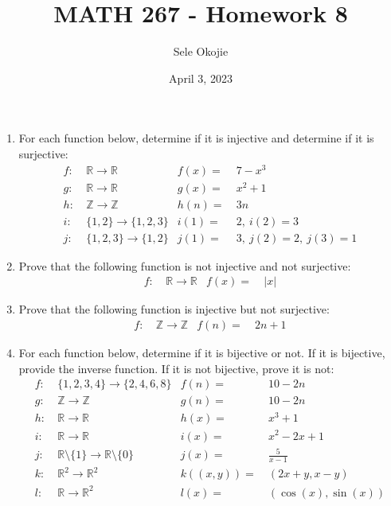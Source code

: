 \documentclass{article}
\title{MATH 267 - Homework 8}
\author{Sele Okojie}
\date{April 3, 2023}
\begin{document}
    \maketitle

    \begin{enumerate}

	\item For each function below, determine if it is injective and determine if it is surjective:
		  \begin{align*}
			f : & \ \mathbb{R} \rightarrow \mathbb{R} & f(x) = & \ 7 - x^3 \\
			g : & \ \mathbb{R} \rightarrow \mathbb{R} & g(x) = & \ x^2 + 1 \\
			h : & \ \mathbb{Z} \rightarrow \mathbb{Z} & h(n) = & \ 3n \\
			i : & \ \{ 1, 2 \} \rightarrow \{ 1, 2, 3 \} & i(1) = & \ 2, \ i(2) = 3 \\
			j : & \ \{ 1, 2, 3 \} \rightarrow \{ 1, 2 \} & j(1) = & \ 3, \ j(2) = 2, \ j(3) = 1
		  \end{align*}

	\item Prove that the following function is not injective and not surjective:
		  \begin{align*}
			f : & \ \mathbb{R} \rightarrow \mathbb{R} & f(x) = & \ |x|
		  \end{align*}

	\item Prove that the following function is injective but not surjective:
		  \begin{align*}
			f : & \ \mathbb{Z} \rightarrow \mathbb{Z} & f(n) = & \ 2n+1
		  \end{align*}

	\item For each function below, determine if it is bijective or not.  If it is bijective, provide the inverse function.  If it is not bijective, prove it is not:
		  \begin{align*}
			f : & \ \{ 1, 2, 3, 4 \} \rightarrow \{ 2, 4, 6, 8 \} & f(n) = & \ 10 - 2n \\
			g : & \ \mathbb{Z} \rightarrow \mathbb{Z} & g(n) = & \ 10 - 2n \\
			h : & \ \mathbb{R} \rightarrow \mathbb{R} & h(x) = & \ x^3 + 1 \\
			i : & \ \mathbb{R} \rightarrow \mathbb{R} & i(x) = & \ x^2 - 2x + 1 \\
			j : & \ \mathbb{R} \setminus \{ 1 \} \rightarrow \mathbb{R} \setminus \{ 0 \} & j(x) = & \ \frac{5}{x-1} \\
			k : & \ \mathbb{R}^2 \rightarrow \mathbb{R}^2 & k((x,y)) = & \ (2x+y, x-y) \\
			l : & \ \mathbb{R} \rightarrow \mathbb{R}^2 & l(x) = & \ (\cos(x), \sin(x))
		  \end{align*}


\end{enumerate}
\end{document}
